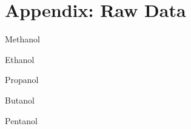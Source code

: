 
\section{{Appendix: Raw Data}}

{Methanol}
        
{Ethanol}
        
{Propanol}
        
{Butanol}
		
{Pentanol}
        














